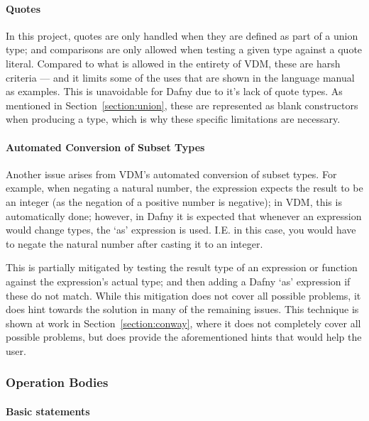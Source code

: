 \documentclass{entcs}
\begin{document}
\paragraph{Quotes}

In this project, quotes are only handled when they are defined as part of a union type; and comparisons are only allowed when testing a given type against a quote literal. Compared to what is allowed in the entirety of VDM, these are harsh criteria --- and it limits some of the uses that are shown in the language manual as examples. This is unavoidable for Dafny due to it's lack of quote types. As mentioned in Section~\ref{section:union}, these are represented as blank constructors when producing a type, which is why these specific limitations are necessary.

\paragraph{Automated Conversion of Subset Types}

Another issue arises from VDM's automated conversion of subset types. For example, when negating a natural number, the expression expects the result to be an integer (as the negation of a positive number is negative); in VDM, this is automatically done; however, in Dafny it is expected that whenever an expression would change types, the `as' expression is used. I.E. in this case, you would have to negate the natural number after casting it to an integer.

This is partially mitigated by testing the result type of an expression or function against the expression's actual type; and then adding a Dafny `as' expression if these do not match. While this mitigation does not cover all possible problems, it does hint towards the solution in many of the remaining issues. This technique is shown at work in Section~\ref{section:conway}, where it does not completely cover all possible problems, but does provide the aforementioned hints that would help the user.

\subsubsection{Operation Bodies}\label{section:statements}

\paragraph{Basic statements}
\end{document}
